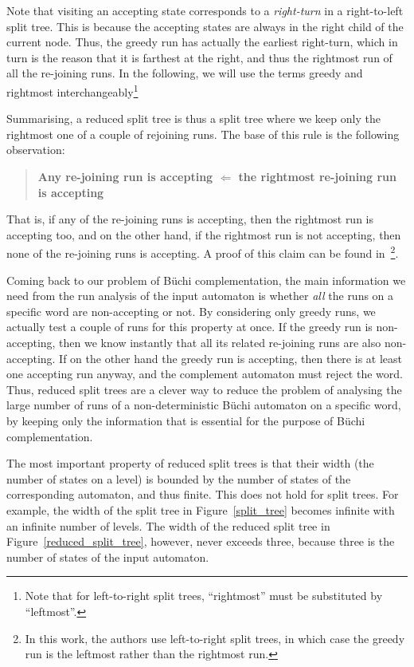 Note that visiting an accepting state corresponds to a \textit{right-turn} in a right-to-left split tree. This is because the accepting states are always in the right child of the current node. Thus, the greedy run has actually the earliest right-turn, which in turn is the reason that it is farthest at the right, and thus the rightmost run of all the re-joining runs. In the following, we will use the terms greedy and rightmost interchangeably\footnote{Note that for left-to-right split trees, ``rightmost'' must be substituted by ``leftmost''.}

Summarising, a reduced split tree is thus a split tree where we keep only the rightmost one of a couple of rejoining runs. The base of this rule is the following observation:

\begin{quote}
\textbf{Any re-joining run is accepting $\Longleftarrow$ the rightmost re-joining run is accepting}
\end{quote}

That is, if any of the re-joining runs is accepting, then the rightmost run is accepting too, and on the other hand, if the rightmost run is not accepting, then none of the re-joining runs is accepting. A proof of this claim can be found in~\cite{vardi2007automata}\footnote{In this work, the authors use left-to-right split trees, in which case the greedy run is the leftmost rather than the rightmost run.}. 

Coming back to our problem of Büchi complementation, the main information we need from the run analysis of the input automaton is whether \textit{all} the runs on a specific word are non-accepting or not. By considering only greedy runs, we actually test a couple of runs for this property at once. If the greedy run is non-accepting, then we know  instantly that all its related re-joining runs are also non-accepting. If on the other hand the greedy run is accepting, then there is at least one accepting run anyway, and the complement automaton must reject the word. Thus, reduced split trees are a clever way to reduce the problem of analysing the large number of runs of a non-deterministic Büchi automaton on a specific word, by keeping only the information that is essential for the purpose of Büchi complementation.

The most important property of reduced split trees is that their width (the number of states on a level) is bounded by the number of states of the corresponding automaton, and thus finite. This does not hold for split trees. For example, the width of the split tree in Figure~\ref{split_tree} becomes infinite with an infinite number of levels. The width of the reduced split tree in Figure~\ref{reduced_split_tree}, however, never exceeds three, because three is the number of states of the input automaton.

